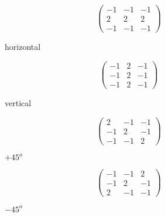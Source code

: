 \begin{figure}[h]
	\begin{minipage}{0cm}
		\[ \left( \begin{array}{ccc}
		-1 & -1 & -1 \\
		2 & 2 & 2 \\
		-1 & -1 & -1 \end{array} \right)\]
		\caption{horizontal}
	\end{minipage}
	\begin{minipage}{10cm}
		\[ \left( \begin{array}{ccc}
		-1 & 2 & -1 \\
		-1 & 2 & -1 \\
		-1 & 2 & -1 \end{array} \right)\]
		\caption{vertical}
	\end{minipage}
	\begin{minipage}{10cm}
		\[ \left( \begin{array}{ccc}
		2 & -1 & -1 \\
		-1 & 2 & -1 \\
		-1 & -1 & 2 \end{array} \right)\]
		\caption{$+45^{o}$}
	\end{minipage}
	\begin{minipage}{10cm}%
		\[ \left( \begin{array}{ccc}
		-1 & -1 & 2 \\
		-1 & 2 & -1 \\
		2 & -1 & -1 \end{array} \right)\]
		\caption{$-45^{o}$}
	\end{minipage}
\label{fig:discontinuidadedelinha}
\end{figure}

